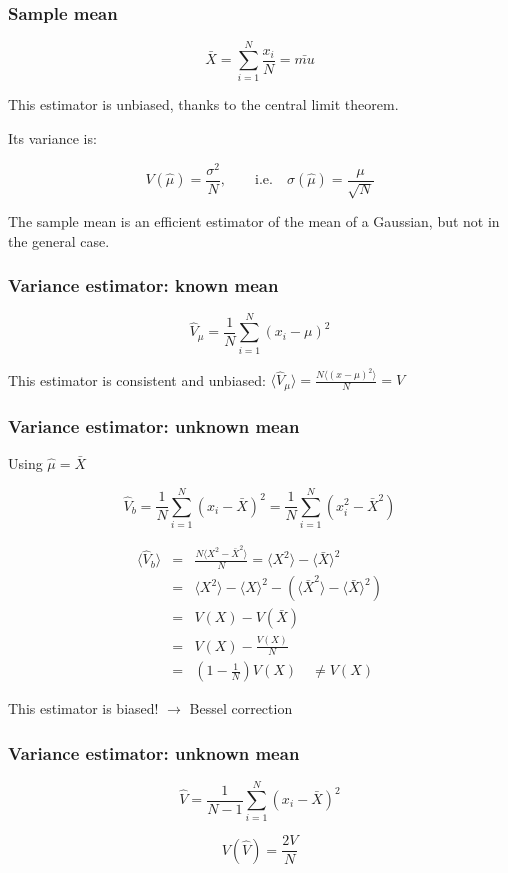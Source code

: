 \documentclass[9pt]{beamer}
\begin{document}
\begin{frame}
 \frametitle{Sample mean}
 
 $$\bar{X} = \sum_{i=1}^N \frac{x_i}{N} = \bar{mu}$$
 
 This estimator is unbiased, thanks to the central limit theorem.
 
 Its variance is:
 
 $$V(\hat{\mu}) = \frac{\sigma^2}{N},\qquad\text{i.e.}\quad \sigma(\hat{\mu}) = \frac{\mu}{\sqrt{N}}$$
 
 The sample mean is an efficient estimator of the mean of a Gaussian, but not in the general case.
\end{frame}

\begin{frame}
 \frametitle{Variance estimator: known mean}
 
 $$\hat{V}_\mu = \frac{1}{N} \sum_{i=1}^N (x_i-\mu)^2$$
 
 This estimator is consistent and unbiased: $\langle \hat{V}_\mu \rangle = \frac{N\langle (x-\mu)^2 \rangle}{N} = V$
\end{frame}

\begin{frame}
 \frametitle{Variance estimator: unknown mean}
 
 Using $\hat{\mu} = \bar{X}$
 
 $$\hat{V}_b = \frac{1}{N} \sum_{i=1}^N (x_i-\bar{X})^2 = \frac{1}{N} \sum_{i=1}^N (x_i^2 - \bar{X}^2)$$
 
 \begin{eqnarray}
  \langle \hat{V}_b \rangle & = & \frac{N \langle X^2 - \bar{X}^2 \rangle}{N} = \langle X^2 \rangle - \langle \bar{X} \rangle^2 \nonumber \\
  & = & \langle X^2 \rangle - \langle X \rangle^2 - \left( \langle \bar{X}^2 \rangle - \langle \bar{X} \rangle ^2 \right) \nonumber \\
  & = & V(X) - V(\bar{X}) \nonumber \\
  & = & V(X) - \frac{V(X)}{N} \nonumber \\
  & = & \left( 1 - \frac{1}{N} \right) V(X)\quad \neq V(X) \nonumber
 \end{eqnarray}
 
 This estimator is biased! $\rightarrow$ Bessel correction

\end{frame}

\begin{frame}
 \frametitle{Variance estimator: unknown mean}

 \begin{block}{}
  $$\hat{V} = \frac{1}{N-1} \sum_{i=1}^N (x_i - \bar{X})^2$$
 \end{block}
 
 $$V(\hat{V}) = \frac{2V}{N}$$

\end{frame}
\end{document}
